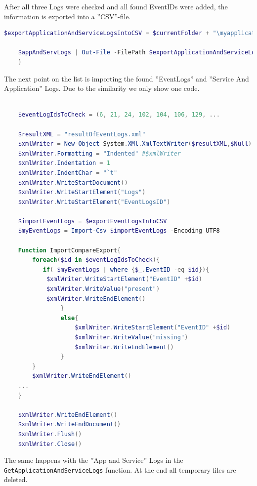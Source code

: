 \clearpage
After all three Logs were checked and all found EventIDs were added, the information is exported into a ''CSV''-file.
\begin{lstlisting}[caption=Function GetApplicationAndServiceLogs Part 2, language=PowerShell]
    $exportApplicationAndServiceLogsIntoCSV = $currentFolder + "\myapplicationandsiencelogs.csv"

    $appAndServLogs | Out-File -FilePath $exportApplicationAndServiceLogsIntoCSV
    }
\end{lstlisting}
The next point on the list is importing the found ''EventLogs'' and ''Service And Application'' Logs. Due to the similarity we only show one code.
\begin{lstlisting}[caption=Function ImportCompareExport, language=PowerShell]
    
    $eventLogIdsToCheck = (6, 21, 24, 102, 104, 106, 129, ...

    $resultXML = "resultOfEventLogs.xml"
    $xmlWriter = New-Object System.XMl.XmlTextWriter($resultXML,$Null)
    $xmlWriter.Formatting = "Indented" #$xmlWriter
    $xmlWriter.Indentation = 1
    $xmlWriter.IndentChar = "`t"
    $xmlWriter.WriteStartDocument()
    $xmlWriter.WriteStartElement("Logs")
    $xmlWriter.WriteStartElement("EventLogsID")

    $importEventLogs = $exportEventLogsIntoCSV
    $myEventLogs = Import-Csv $importEventLogs -Encoding UTF8

    Function ImportCompareExport{
        foreach($id in $eventLogIdsToCheck){
           if( $myEventLogs | where {$_.EventID -eq $id}){
            $xmlWriter.WriteStartElement("EventID" +$id)
            $xmlWriter.WriteValue("present")
            $xmlWriter.WriteEndElement()
                }
                else{
                    $xmlWriter.WriteStartElement("EventID" +$id)
                    $xmlWriter.WriteValue("missing")
                    $xmlWriter.WriteEndElement()
                }
        }
        $xmlWriter.WriteEndElement()
    ...
    }

    $xmlWriter.WriteEndElement()
    $xmlWriter.WriteEndDocument()
    $xmlWriter.Flush()
    $xmlWriter.Close()
\end{lstlisting}

The same happens with the ''App and Service'' Logs in the \lstinline|GetApplicationAndServiceLogs| function. At the end all temporary files are deleted.
